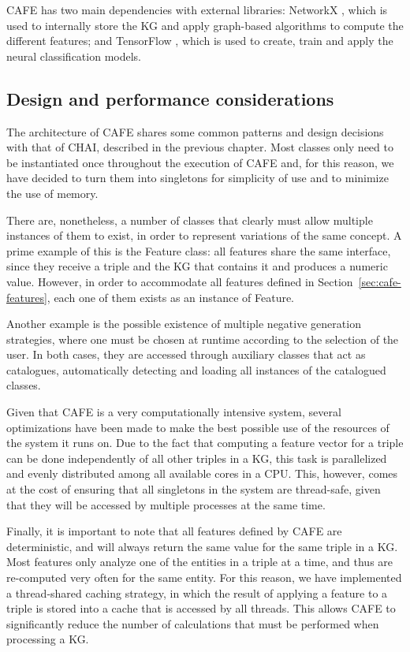 CAFE has two main dependencies with external libraries: NetworkX \cite{hagberg2008networkx}, which is used to internally store the KG and apply graph-based algorithms to compute the different features; and TensorFlow \cite{tensorflow2015}, which is used to create, train and apply the neural classification models.

\subsection{Design and performance considerations}
The architecture of CAFE shares some common patterns and design decisions with that of CHAI, described in the previous chapter. Most classes only need to be instantiated once throughout the execution of CAFE and, for this reason, we have decided to turn them into singletons for simplicity of use and to minimize the use of memory.

There are, nonetheless, a number of classes that clearly must allow multiple instances of them to exist, in order to represent variations of the same concept. A prime example of this is the Feature class: all features share the same interface, since they receive a triple and the KG that contains it and produces a numeric value. However, in order to accommodate all features defined in Section~\ref{sec:cafe-features}, each one of them exists as an instance of Feature.

Another example is the possible existence of multiple negative generation strategies, where one must be chosen at runtime according to the selection of the user. In both cases, they are accessed through auxiliary classes that act as catalogues, automatically detecting and loading all instances of the catalogued classes. 

Given that CAFE is a very computationally intensive system, several optimizations have been made to make the best possible use of the resources of the system it runs on. Due to the fact that computing a feature vector for a triple can be done independently of all other triples in a KG, this task is parallelized and evenly distributed among all available cores in a CPU. This, however, comes at the cost of ensuring that all singletons in the system are thread-safe, given that they will be accessed by multiple processes at the same time.

Finally, it is important to note that all features defined by CAFE are deterministic, and will always return the same value for the same triple in a KG. Most features only analyze one of the entities in a triple at a time, and thus are re-computed very often for the same entity. For this reason, we have implemented a thread-shared caching strategy, in which the result of applying a feature to a triple is stored into a cache that is accessed by all threads. This allows CAFE to significantly reduce the number of calculations that must be performed when processing a KG.

